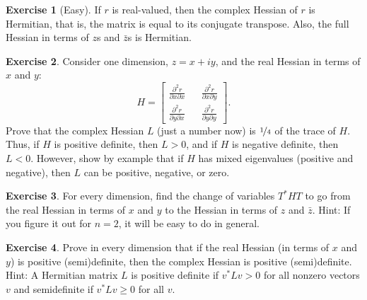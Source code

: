 \documentclass[12pt,openany]{book}
\theoremstyle{plain}
\theoremstyle{remark}
\theoremstyle{definition}
\newenvironment{exbox}{%
    \def\FrameCommand{\vrule width 1pt \relax\hspace{10pt}}%
    \MakeFramed{\advance\hsize-\width\FrameRestore}%
}{%
    \endMakeFramed
}
\theoremstyle{exercise}
\newtheorem{exercise}{Exercise}[section]
\theoremstyle{example}
\begin{document}
\begin{exbox}
\begin{exercise}[Easy]
If $r$ is real-valued, then the complex Hessian of $r$ is Hermitian, that
is, the matrix is equal to its conjugate transpose.  Also,
the full Hessian in terms of $z$s and $\bar{z}$s is Hermitian.
\end{exercise}

\begin{exercise}
Consider one dimension, $z = x+iy$, and the real Hessian
in terms of $x$ and $y$:
\begin{equation*}
H=\begin{bmatrix}
\frac{\partial^2 r}{\partial x\partial x} &&
\frac{\partial^2 r}{\partial x \partial y}
\\
\frac{\partial^2 r}{\partial y \partial x} &&
\frac{\partial^2 r}{\partial y\partial y}
\end{bmatrix} .
\end{equation*}
Prove that the complex Hessian $L$ (just a number now) is $\nicefrac{1}{4}$
of the trace of $H$.
Thus, if $H$ is positive definite, then $L > 0$, and if $H$ is negative
definite, then $L < 0$.  However, show by example that
if $H$ has mixed eigenvalues (positive
and negative), then $L$ can be positive, negative, or zero.
\end{exercise}

\begin{exercise}
For every dimension,
find the change of variables $T^* H T$ to go from the real Hessian in terms
of $x$ and $y$ to the Hessian in terms of $z$ and $\bar{z}$.
Hint: If you figure it out for $n=2$, it
will be easy to do in general.
\end{exercise}

\begin{exercise}
Prove in every dimension that if the real Hessian (in terms of $x$ and $y$) is
positive (semi)definite, then the complex Hessian is positive (semi)definite.
Hint: A Hermitian matrix $L$ is positive definite if $v^*Lv > 0$ for all
nonzero vectors $v$ and semidefinite if $v^*Lv \geq 0$ for all $v$.
\end{exercise}
\end{exbox}
\end{document}
